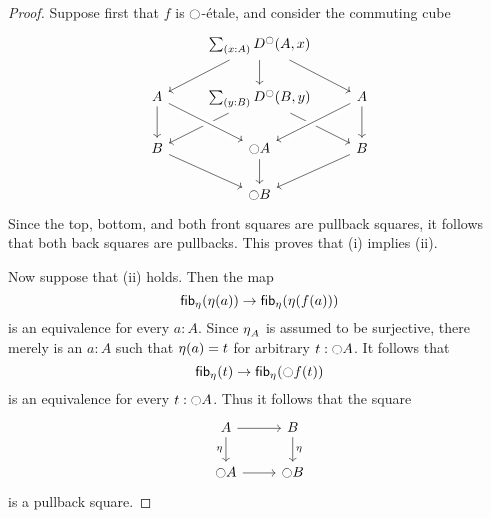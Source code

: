 \documentclass[9pt,twosided]{amsart}
\begin{document}
\begin{proof}
Suppose first that $f$ is ${\ocircle}$-\'etale, and consider the commuting cube
\begin{equation*}
\begin{tikzcd}
& \sm{x:A}D^\modal(A,x) \arrow[dl] \arrow[d] \arrow[dr] \\
A \arrow[d] & \sm{y:B}D^\modal(B,y) \arrow[dl] \arrow[dr] & A \arrow[dl,crossing over] \arrow[d] \\
B \arrow[dr] & \modal A \arrow[from=ul,crossing over] \arrow[d] & B \arrow[dl] \\
& \modal B
\end{tikzcd}
\end{equation*}
Since the top, bottom, and both front squares are pullback squares, it follows that both back squares are pullbacks. This proves that (i) implies (ii).

Now suppose that (ii) holds. Then the map
\begin{equation*}
\fib{\modalunit}{\modalunit(a)}\to \fib{\modalunit}{\modalunit(f(a))}
\end{equation*}
is an equivalence for every $a:A$. Since ${\eta_{}}_A$ is assumed to be surjective, there merely is an $a:A$ such that ${\eta_{}}(a)=t$ for arbitrary $t:{\ocircle} A$.
It follows that
\begin{equation*}
\fib{\modalunit}{t}\to \fib{\modalunit}{\modal f(t)}
\end{equation*}
is an equivalence for every $t:{\ocircle} A$. Thus it follows that the square
\begin{equation*}
\begin{tikzcd}
A \arrow[d,swap,"\modalunit"] \arrow[r] & B \arrow[d,"\modalunit"] \\
\modal A \arrow[r] & \modal B
\end{tikzcd}
\end{equation*}
is a pullback square.
\end{proof}
\end{document}
